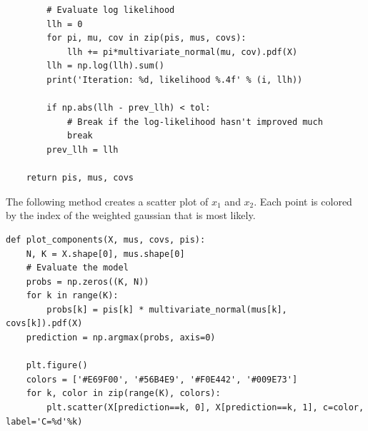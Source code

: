 \documentclass[a4paper]{article}
\begin{document}
\begin{enumerate}
\begin{lstlisting}
        # Evaluate log likelihood
        llh = 0
        for pi, mu, cov in zip(pis, mus, covs):
            llh += pi*multivariate_normal(mu, cov).pdf(X)
        llh = np.log(llh).sum()
        print('Iteration: %d, likelihood %.4f' % (i, llh))
        
        if np.abs(llh - prev_llh) < tol:
            # Break if the log-likelihood hasn't improved much
            break
        prev_llh = llh
    
    return pis, mus, covs 
\end{lstlisting}
The following method creates a scatter plot of $x_1$ and $x_2$. Each point is colored by the index of the weighted gaussian that is most likely. 
\begin{lstlisting}
def plot_components(X, mus, covs, pis):
    N, K = X.shape[0], mus.shape[0]
    # Evaluate the model
    probs = np.zeros((K, N))
    for k in range(K):
        probs[k] = pis[k] * multivariate_normal(mus[k], covs[k]).pdf(X)
    prediction = np.argmax(probs, axis=0)
    
    plt.figure()
    colors = ['#E69F00', '#56B4E9', '#F0E442', '#009E73']
    for k, color in zip(range(K), colors):
        plt.scatter(X[prediction==k, 0], X[prediction==k, 1], c=color, label='C=%d'%k)


\end{lstlisting}
\end{enumerate}
\end{document}
